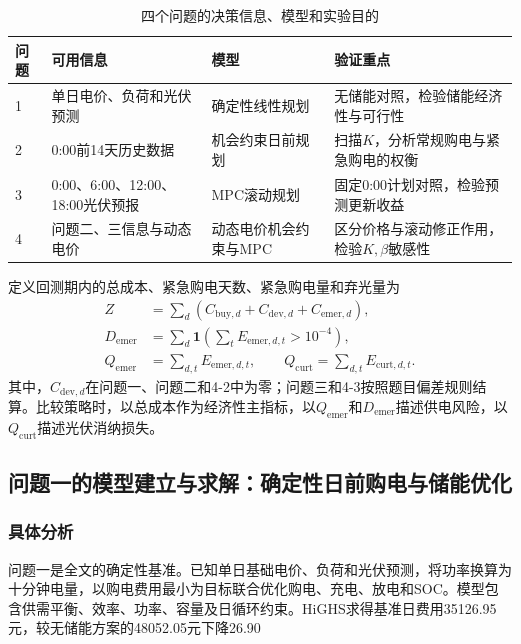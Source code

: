 \documentclass{cumcmthesis}
\begin{document}
\begin{table}[H]
\centering
\normalsize
\renewcommand\arraystretch{1.25}
\caption{四个问题的决策信息、模型和实验目的}
\label{tab:research_design}
\begin{tabularx}{\textwidth}{p{0.8cm}p{4.0cm}p{4.0cm}X}
\toprule
\textbf{问题} & \textbf{可用信息} & \textbf{模型} & \textbf{验证重点}\\
\midrule
1 & 单日电价、负荷和光伏预测 & 确定性线性规划 & 无储能对照，检验储能经济性与可行性\\
2 & 0:00前14天历史数据 & 机会约束日前规划 & 扫描$K$，分析常规购电与紧急购电的权衡\\
3 & 0:00、6:00、12:00、18:00光伏预报 & MPC滚动规划 & 固定0:00计划对照，检验预测更新收益\\
4 & 问题二、三信息与动态电价 & 动态电价机会约束与MPC & 区分价格与滚动修正作用，检验$K,\beta$敏感性\\
\bottomrule
\end{tabularx}
\end{table}

定义回测期内的总成本、紧急购电天数、紧急购电量和弃光量为
\begin{equation}
\begin{aligned}
Z&=\sum_d(C_{\mathrm{buy},d}+C_{\mathrm{dev},d}+C_{\mathrm{emer},d}),\\
D_{\mathrm{emer}}&=\sum_d\mathbf{1}\left(\sum_tE_{\mathrm{emer},d,t}>10^{-4}\right),\\
Q_{\mathrm{emer}}&=\sum_{d,t}E_{\mathrm{emer},d,t},\qquad
Q_{\mathrm{curt}}=\sum_{d,t}E_{\mathrm{curt},d,t}.
\end{aligned}
\tag{7a}
\end{equation}
其中，$C_{\mathrm{dev},d}$在问题一、问题二和4-2中为零；问题三和4-3按照题目偏差规则结算。比较策略时，以总成本作为经济性主指标，以$Q_{\mathrm{emer}}$和$D_{\mathrm{emer}}$描述供电风险，以$Q_{\mathrm{curt}}$描述光伏消纳损失。

\subsection{问题一的模型建立与求解：确定性日前购电与储能优化}

\subsubsection{具体分析}

问题一是全文的确定性基准。已知单日基础电价、负荷和光伏预测，将功率换算为十分钟电量，以购电费用最小为目标联合优化购电、充电、放电和SOC。模型包含供需平衡、效率、功率、容量及日循环约束。HiGHS求得基准日费用35126.95元，较无储能方案的48052.05元下降26.90%
\end{document}
